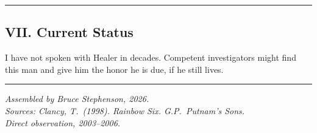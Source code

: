 \vspace{1cm}\hrule\vspace{1cm}

\subsection*{VII. Current Status}
\label{record:hd-current-status}

I have not spoken with Healer in decades. Competent investigators might find this man and give him the honor he is due, if he still lives.

\vspace{1cm}\hrule\vspace{0.5cm}

\begin{flushright}\small\textit{%
Assembled by Bruce Stephenson, 2026.\\
Sources: Clancy, T.\ (1998). Rainbow Six. G.P.\ Putnam's Sons.\\
Direct observation, 2003--2006.%
}\end{flushright}

\chapterreturn
